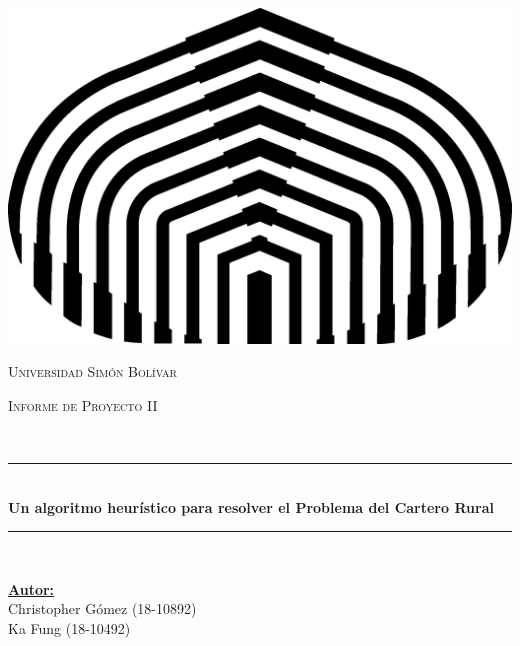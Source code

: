 \documentclass[11pt]{article}
\begin{document}

\begin{center} 
   \newcommand{\HRule}{\rule{\linewidth}{0.5mm}}  

   \begin{minipage}{0.48\textwidth}
      \begin{center}
         \includegraphics[scale = 0.5]{logo.png}
      \end{center}
   \end{minipage}

   \vspace*{1.0cm}                       
   \textsc{\huge Universidad Simón Bolívar} \\ [1.5cm] 

   \begin{minipage}{0.9\textwidth} 
      \begin{center}                                                             
         \textsc{\LARGE Informe de Proyecto II }
      \end{center}
   \end{minipage} \\ [3cm]

   \vspace*{1cm}                                                                              
   \HRule \\ [0.4cm]                                                  
   {\huge \bfseries Un algoritmo heurístico para resolver el Problema del Cartero Rural} \\ [0.4cm] 
   \HRule \\ [4cm]

   \begin{minipage}{\textwidth} 
      \begin{flushleft} \large    
         \textbf{\underline{Autor:}} \\ 
         Christopher Gómez (18-10892)\\
         Ka Fung (18-10492)\\
      \end{flushleft}
   \end{minipage}


\end{center}
\end{document}
